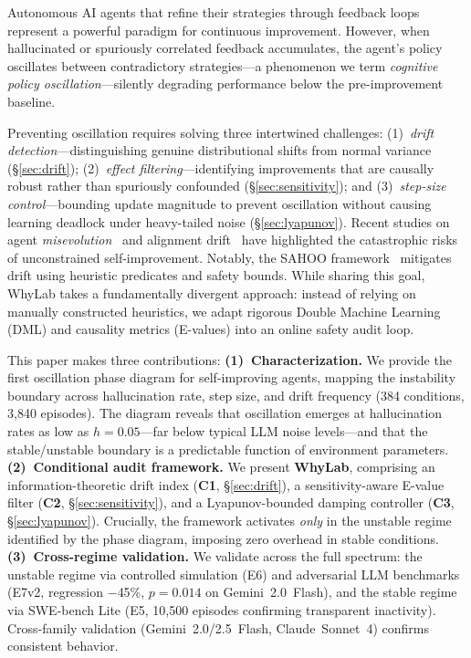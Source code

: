 \documentclass{article}
\begin{document}

Autonomous AI agents that refine their strategies through feedback
loops~\cite{shinn2023reflexion,yao2023react} represent a powerful
paradigm for continuous improvement. However, when hallucinated or
spuriously correlated feedback accumulates, the agent's policy
oscillates between contradictory strategies---a phenomenon we term
\emph{cognitive policy oscillation}---silently degrading performance
below the pre-improvement baseline.

Preventing oscillation requires solving three intertwined challenges:
(1)~\emph{drift detection}---distinguishing genuine distributional
shifts from normal variance (\S\ref{sec:drift});
(2)~\emph{effect filtering}---identifying improvements that are
causally robust rather than spuriously confounded
(\S\ref{sec:sensitivity}); and
(3)~\emph{step-size control}---bounding update magnitude to prevent
oscillation without causing learning deadlock under heavy-tailed noise
(\S\ref{sec:lyapunov}).
Recent studies on agent \emph{misevolution}~\cite{misevolution2025} and alignment drift~\cite{sahoo2026sahoo} have highlighted the catastrophic risks of unconstrained self-improvement. Notably, the SAHOO framework~\cite{sahoo2026sahoo} mitigates drift using heuristic predicates and safety bounds. While sharing this goal, WhyLab takes a fundamentally divergent approach: instead of relying on manually constructed heuristics, we adapt rigorous Double Machine Learning (DML) and causality metrics (E-values) into an online safety audit loop.

This paper makes three contributions:
\textbf{(1)~Characterization.} We provide the first oscillation phase diagram for self-improving agents, mapping the instability boundary across hallucination rate, step size, and drift frequency (384 conditions, 3{,}840 episodes). The diagram reveals that oscillation emerges at hallucination rates as low as $h{=}0.05$---far below typical LLM noise levels---and that the stable/unstable boundary is a predictable function of environment parameters.
\textbf{(2)~Conditional audit framework.} We present \textbf{WhyLab}, comprising an information-theoretic drift index (\textbf{C1}, \S\ref{sec:drift}), a sensitivity-aware E-value filter (\textbf{C2}, \S\ref{sec:sensitivity}), and a Lyapunov-bounded damping controller (\textbf{C3}, \S\ref{sec:lyapunov}). Crucially, the framework activates \emph{only} in the unstable regime identified by the phase diagram, imposing zero overhead in stable conditions.
\textbf{(3)~Cross-regime validation.} We validate across the full spectrum: the unstable regime via controlled simulation (E6) and adversarial LLM benchmarks (E7v2, regression $-$45\%, $p{=}0.014$ on Gemini~2.0~Flash), and the stable regime via SWE-bench Lite (E5, 10{,}500 episodes confirming transparent inactivity). Cross-family validation (Gemini~2.0/2.5~Flash, Claude~Sonnet~4) confirms consistent behavior.
\end{document}
